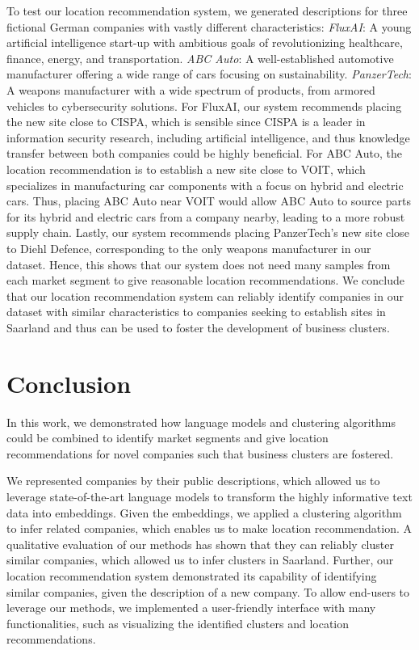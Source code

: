 \documentclass[12pt]{article}
\begin{document}
   To test our location recommendation system, we generated descriptions for three fictional German companies with vastly different characteristics:
   \textit{FluxAI}: A young artificial intelligence start-up with ambitious goals of revolutionizing healthcare, finance, energy, and transportation.    
   \textit{ABC Auto}: A well-established automotive manufacturer offering a wide range of cars focusing on sustainability.    
   \textit{PanzerTech}: A weapons manufacturer with a wide spectrum of products, from armored vehicles to cybersecurity solutions.       
   For FluxAI, our system recommends placing the new site close to CISPA, which is sensible since CISPA is a leader in information security research, including artificial intelligence, and thus knowledge transfer between both companies could be highly beneficial. 
   For ABC Auto, the location recommendation is to establish a new site close to VOIT, which specializes in manufacturing car components with a focus on hybrid and electric cars. Thus, placing ABC Auto near VOIT would allow ABC Auto to source parts for its hybrid and electric cars from a company nearby, leading to a more robust supply chain.
   Lastly, our system recommends placing PanzerTech's new site close to Diehl Defence, corresponding to the only weapons manufacturer in our dataset. Hence, this shows that our system does not need many samples from each market segment to give reasonable location recommendations.   
   We conclude that our location recommendation system can reliably identify companies in our dataset with similar characteristics to companies seeking to establish sites in Saarland and thus can be used to foster the development of business clusters.
   
   \section*{Conclusion}
   In this work, we demonstrated how language models and clustering algorithms could be combined to identify market segments and give location recommendations for novel companies such that business clusters are fostered.
   
   We represented companies by their public descriptions, which allowed us to leverage state-of-the-art language models to transform the highly informative text data into embeddings. Given the embeddings, we applied a clustering algorithm to infer related companies, which enables us to make location recommendation. A qualitative evaluation of our methods has shown that they can reliably cluster similar companies, which allowed us to infer clusters in Saarland. Further, our location recommendation system demonstrated its capability of identifying similar companies, given the description of a new company. To allow end-users to leverage our methods, we implemented a user-friendly interface with many functionalities, such as visualizing the identified clusters and location recommendations.
   
\end{document}
